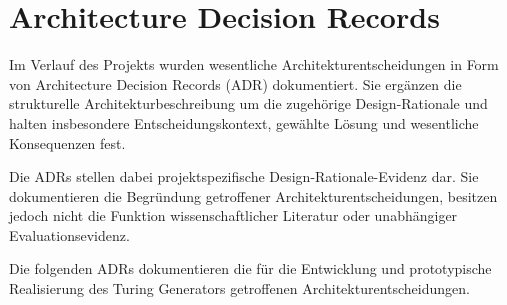 \section{Architecture Decision Records}
\label{app:architecture_decision_records}

Im Verlauf des Projekts wurden wesentliche Architekturentscheidungen in Form
von Architecture Decision Records (ADR) dokumentiert. Sie ergänzen die
strukturelle Architekturbeschreibung um die zugehörige Design-Rationale und
halten insbesondere Entscheidungskontext, gewählte Lösung und wesentliche
Konsequenzen fest.

Die ADRs stellen dabei projektspezifische Design-Rationale-Evidenz dar. Sie
dokumentieren die Begründung getroffener Architekturentscheidungen, besitzen
jedoch nicht die Funktion wissenschaftlicher Literatur oder unabhängiger
Evaluationsevidenz.

Die folgenden ADRs dokumentieren die für die Entwicklung und prototypische
Realisierung des Turing Generators getroffenen Architekturentscheidungen.


